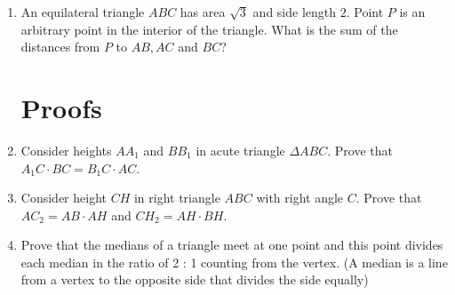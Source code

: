 \documentclass[letterpaper]{article}
\newcommand\itemtwo{\stepcounter{enumi}\item[$\ast\ast$\, \theenumi.]}
\begin{document}
\begin{enumerate}
\itemtwo An equilateral triangle $ABC$ has area $\sqrt 3$ and side length $2$. Point $P$ is an arbitrary point in the interior of the triangle. What is the sum of the distances from $P$ to $AB, AC$ and $BC$?

\section*{Proofs}

\item Consider heights $AA_1$ and $BB_1$ in acute triangle $\Delta ABC$. Prove that $A_1C \cdot BC = B_1C \cdot AC$.

\item Consider height $CH$ in right triangle $ABC$ with right angle $C$. Prove that $AC_2 = AB \cdot AH$ and $CH_2 = AH \cdot BH$.

\itemtwo Prove that the medians of a triangle meet at one point and this point divides each median in the ratio of 2 : 1 counting from the vertex. (A median is a line from a vertex to the opposite side that divides the side equally)

\end{enumerate}
\end{document}
